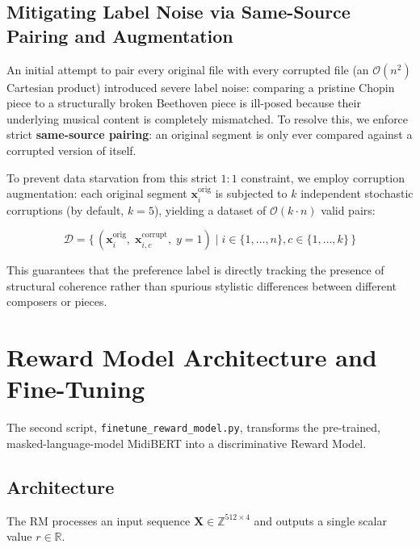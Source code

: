\documentclass[11pt,a4paper]{article}
\begin{document}
\subsection{Mitigating Label Noise via Same-Source Pairing and Augmentation}

An initial attempt to pair every original file with every corrupted file (an $\mathcal{O}(n^2)$ Cartesian product) introduced severe label noise: comparing a pristine Chopin piece to a structurally broken Beethoven piece is ill-posed because their underlying musical content is completely mismatched. To resolve this, we enforce strict \textbf{same-source pairing}: an original segment is only ever compared against a corrupted version of itself. 

To prevent data starvation from this strict $1:1$ constraint, we employ corruption augmentation: each original segment $\mathbf{x}_i^{\text{orig}}$ is subjected to $k$ independent stochastic corruptions (by default, $k=5$), yielding a dataset of $\mathcal{O}(k \cdot n)$ valid pairs:

\begin{equation}
    \mathcal{D} = \bigl\{\,(\mathbf{x}_i^{\text{orig}},\;\mathbf{x}_{i,c}^{\text{corrupt}},\;y=1) \;\big|\; i \in \{1,\ldots,n\}, c \in \{1,\ldots,k\}\,\bigr\}
\end{equation}

This guarantees that the preference label is directly tracking the presence of structural coherence rather than spurious stylistic differences between different composers or pieces.

\section{Reward Model Architecture and Fine-Tuning}
\label{sec:model}

The second script, \texttt{finetune\_reward\_model.py}, transforms the pre-trained, masked-language-model MidiBERT into a discriminative Reward Model.

\subsection{Architecture}

The RM processes an input sequence $\mathbf{X} \in \mathbb{Z}^{512 \times 4}$ and outputs a single scalar value $r \in \mathbb{R}$.
\end{document}
